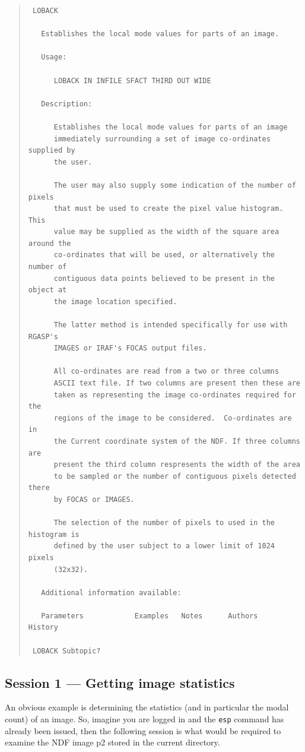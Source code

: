 \documentclass[twoside,11pt]{article}
\newcommand{\xlabel}[1]{}
\newenvironment{myquote}{\begin{quote}\begin{small}}{\end{small}\end{quote}}
\begin{document}
\begin{myquote}
\begin{verbatim}
 LOBACK
 
   Establishes the local mode values for parts of an image.
 
   Usage:
 
      LOBACK IN INFILE SFACT THIRD OUT WIDE
 
   Description:
 
      Establishes the local mode values for parts of an image
      immediately surrounding a set of image co-ordinates supplied by
      the user.
 
      The user may also supply some indication of the number of pixels
      that must be used to create the pixel value histogram. This
      value may be supplied as the width of the square area around the
      co-ordinates that will be used, or alternatively the number of
      contiguous data points believed to be present in the object at
      the image location specified.
 
      The latter method is intended specifically for use with RGASP's
      IMAGES or IRAF's FOCAS output files.
 
      All co-ordinates are read from a two or three columns
      ASCII text file. If two columns are present then these are
      taken as representing the image co-ordinates required for the
      regions of the image to be considered.  Co-ordinates are in
      the Current coordinate system of the NDF. If three columns are
      present the third column respresents the width of the area
      to be sampled or the number of contiguous pixels detected there
      by FOCAS or IMAGES.
 
      The selection of the number of pixels to used in the histogram is
      defined by the user subject to a lower limit of 1024 pixels
      (32x32).
 
   Additional information available:
 
   Parameters            Examples   Notes      Authors    History
 
 LOBACK Subtopic? 
\end{verbatim}
\end{myquote}


\subsection{Session 1 --- Getting image statistics}
\xlabel{SESSION1}

An obvious example is determining the statistics (and in particular the
modal count)  of an image. So, imagine you are logged in and the
{\tt esp} command has already been issued, then the following session is
what would be required to examine the NDF image p2 stored in the
current directory.
\end{document}

